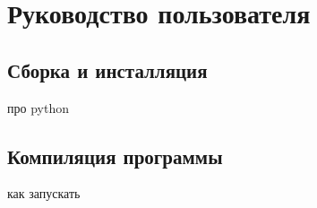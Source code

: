 \section{Руководство пользователя}
    \subsection{Сборка и инсталляция}
        про python
    \subsection{Компиляция программы}
        как запускать
